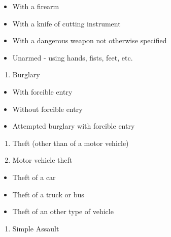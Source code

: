 \documentclass[
  12pt,
  openany]{book}
\providecommand{\tightlist}{%
  \setlength{\itemsep}{0pt}\setlength{\parskip}{0pt}}
\begin{document}
\begin{itemize}
\tightlist
\item
  With a firearm\\
\item
  With a knife of cutting instrument\\
\item
  With a dangerous weapon not otherwise specified\\
\item
  Unarmed - using hands, fists, feet, etc.\\
\end{itemize}

\begin{enumerate}
\def\labelenumi{\arabic{enumi}.}
\setcounter{enumi}{4}
\tightlist
\item
  Burglary\\
\end{enumerate}

\begin{itemize}
\tightlist
\item
  With forcible entry\\
\item
  Without forcible entry\\
\item
  Attempted burglary with forcible entry\\
\end{itemize}

\begin{enumerate}
\def\labelenumi{\arabic{enumi}.}
\setcounter{enumi}{5}
\tightlist
\item
  Theft (other than of a motor vehicle)\\
\item
  Motor vehicle theft\\
\end{enumerate}

\begin{itemize}
\tightlist
\item
  Theft of a car\\
\item
  Theft of a truck or bus\\
\item
  Theft of an other type of vehicle\\
\end{itemize}

\begin{enumerate}
\def\labelenumi{\arabic{enumi}.}
\setcounter{enumi}{7}
\tightlist
\item
  Simple Assault
\end{enumerate}
\end{document}
